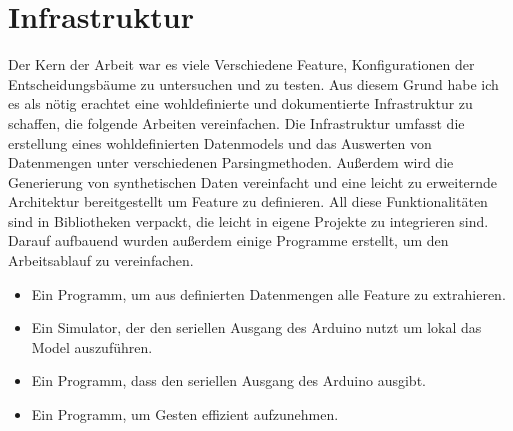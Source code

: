 \section{Infrastruktur}
Der Kern der Arbeit war es viele Verschiedene Feature, Konfigurationen der Entscheidungsbäume zu untersuchen und zu testen. Aus diesem Grund habe ich es als nötig erachtet eine wohldefinierte und dokumentierte Infrastruktur
zu schaffen, die folgende Arbeiten vereinfachen. Die Infrastruktur umfasst die erstellung eines wohldefinierten Datenmodels und das Auswerten von Datenmengen unter verschiedenen Parsingmethoden. Außerdem wird die
Generierung von synthetischen Daten vereinfacht und eine leicht zu erweiternde Architektur bereitgestellt um Feature zu definieren. All diese Funktionalitäten sind in Bibliotheken verpackt, die leicht in eigene Projekte zu
integrieren sind. Darauf aufbauend wurden außerdem einige Programme erstellt, um den Arbeitsablauf zu vereinfachen.
\begin{itemize}
    \item Ein Programm, um aus definierten Datenmengen alle Feature zu extrahieren.
    \item Ein Simulator, der den seriellen Ausgang des Arduino nutzt um lokal das Model auszuführen.
    \item Ein Programm, dass den seriellen Ausgang des Arduino ausgibt.
    \item Ein Programm, um Gesten effizient aufzunehmen.
\end{itemize}







